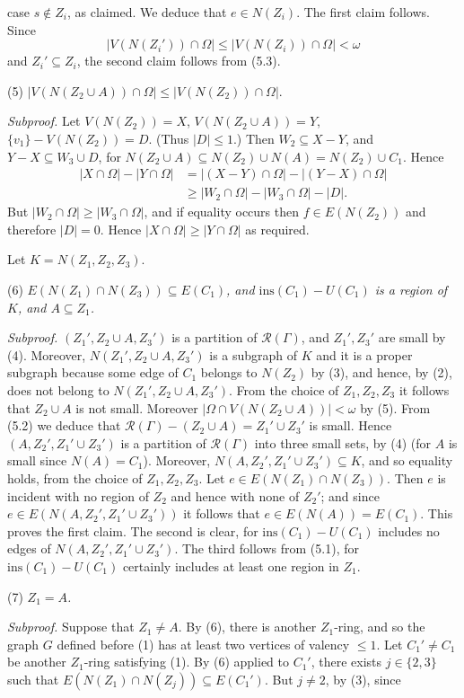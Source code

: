 \noindent case $s \notin Z_i$, as claimed. We deduce that $e \in N(Z_i)$. The first claim follows. Since
\begin{equation*}
|V(N(Z_i')) \cap \Omega| \le |V(N(Z_i)) \cap \Omega| < \omega
\end{equation*}
and $Z_i' \subseteq Z_i$, the second claim follows from (5.3).

\hspace*{12pt}(5) $|V(N(Z_2 \cup A)) \cap \Omega| \le |V(N(Z_2)) \cap \Omega|$.

\textit{Subproof.} Let $V(N(Z_2)) = X$, $V(N(Z_2 \cup A)) = Y$, $\{v_1\} - V(N(Z_2)) = D$. (Thus $|D| \le 1$.) Then $W_2 \subseteq X - Y$, and $Y - X \subseteq W_3 \cup D$, for $N(Z_2 \cup A) \subseteq N(Z_2) \cup N(A) = N(Z_2) \cup C_1$. Hence
\begin{align*}
|X \cap \Omega| - |Y \cap \Omega| &= |(X - Y) \cap \Omega| - |(Y - X) \cap \Omega| \\
&\ge |W_2 \cap \Omega| - |W_3 \cap \Omega| - |D|.
\end{align*}
But $|W_2 \cap \Omega| \ge |W_3 \cap \Omega|$, and if equality occurs then $f \in E(N(Z_2))$ and therefore $|D| = 0$. Hence $|X \cap \Omega| \ge |Y \cap \Omega|$ as required.

Let $K = N(Z_1, Z_2, Z_3)$.

\hspace*{12pt}(6) \textit{$E(N(Z_1) \cap N(Z_3)) \subseteq E(C_1)$, and $\text{ins}(C_1) - U(C_1)$ is a region of $K$, and $A \subseteq Z_1$.}

\textit{Subproof.} $(Z_1', Z_2 \cup A, Z_3')$ is a partition of $\mathscr{R}(\Gamma)$, and $Z_1', Z_3'$ are small by (4). Moreover, $N(Z_1', Z_2 \cup A, Z_3')$ is a subgraph of $K$ and it is a proper subgraph because some edge of $C_1$ belongs to $N(Z_2)$ by (3), and hence, by (2), does not belong to $N(Z_1', Z_2 \cup A, Z_3')$. From the choice of $Z_1, Z_2, Z_3$ it follows that $Z_2 \cup A$ is not small. Moreover $|\Omega \cap V(N(Z_2 \cup A))| < \omega$ by (5). From (5.2) we deduce that $\mathscr{R}(\Gamma) - (Z_2 \cup A) = Z_1' \cup Z_3'$ is small. Hence $(A, Z_2', Z_1' \cup Z_3')$ is a partition of $\mathscr{R}(\Gamma)$ into three small sets, by (4) (for $A$ is small since $N(A) = C_1$). Moreover, $N(A, Z_2', Z_1' \cup Z_3') \subseteq K$, and so equality holds, from the choice of $Z_1, Z_2, Z_3$. Let $e \in E(N(Z_1) \cap N(Z_3))$. Then $e$ is incident with no region of $Z_2$ and hence with none of $Z_2'$; and since $e \in E(N(A, Z_2', Z_1' \cup Z_3'))$ it follows that $e \in E(N(A)) = E(C_1)$. This proves the first claim. The second is clear, for $\text{ins}(C_1) - U(C_1)$ includes no edges of $N(A, Z_2', Z_1' \cup Z_3')$. The third follows from (5.1), for $\text{ins}(C_1) - U(C_1)$ certainly includes at least one region in $Z_1$.

\hspace*{12pt}(7) \textit{$Z_1 = A$.}

\textit{Subproof.} Suppose that $Z_1 \ne A$. By (6), there is another $Z_1$-ring, and so the graph $G$ defined before (1) has at least two vertices of valency $\le 1$. Let $C_1' \ne C_1$ be another $Z_1$-ring satisfying (1). By (6) applied to $C_1'$, there exists $j \in \{2, 3\}$ such that $E(N(Z_1) \cap N(Z_j)) \subseteq E(C_1')$. But $j \ne 2$, by (3), since

